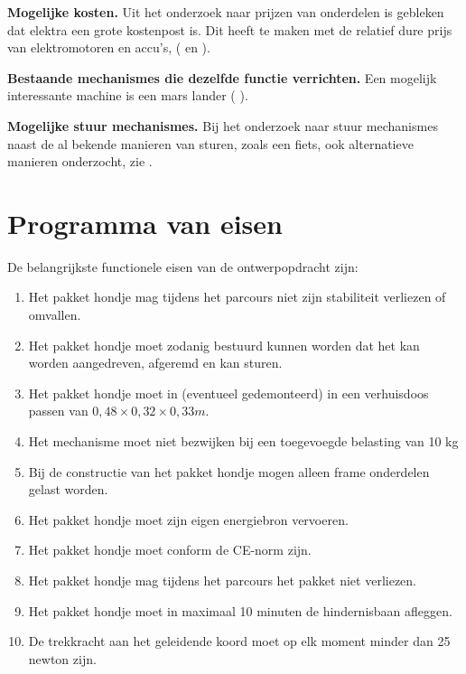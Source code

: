 \textbf{Mogelijke kosten.} Uit het onderzoek naar prijzen van onderdelen is gebleken dat elektra een grote kostenpost is. Dit heeft te maken met de relatief dure prijs van elektromotoren en accu's, (\cite{123accu.nl} en \cite{Conrad}).
\vspace{\baselineskip}

\textbf{Bestaande mechanismes die dezelfde functie verrichten.} Een mogelijk interessante machine is een mars lander ( \cite{r.g._bonitz_nguyen_kim_bonitz_folkner_golombek_olson_spohn_grott_et_al._1970}).
\vspace{\baselineskip}

\textbf{Mogelijke stuur mechanismes.} Bij het onderzoek naar stuur mechanismes naast de al bekende manieren van sturen, zoals een fiets, ook alternatieve manieren onderzocht, zie \cite{Stuurmechanisme}.
\vspace{\baselineskip}


\vspace{\baselineskip}

\section{Programma van eisen}
\label{se:PVE}

De belangrijkste functionele eisen van de ontwerpopdracht zijn: 
\begin{enumerate}
    \item Het pakket hondje mag tijdens het parcours niet zijn stabiliteit verliezen of omvallen.
    \item Het pakket hondje moet zodanig bestuurd kunnen worden dat het kan worden aangedreven, afgeremd en kan sturen.
    \item Het pakket hondje moet in (eventueel gedemonteerd) in een verhuisdoos passen van $ 0,48 \times 0,32 \times 0,33 m.$
    \item Het mechanisme moet niet bezwijken bij een toegevoegde belasting van 10 kg 
    \item Bij de constructie van het pakket hondje mogen alleen frame onderdelen gelast worden.
    \item Het pakket hondje moet zijn eigen energiebron vervoeren.
    \item Het pakket hondje moet conform de CE-norm zijn.
    \item Het pakket hondje mag tijdens het parcours het pakket niet verliezen.
    \item Het pakket hondje moet in maximaal 10 minuten de hindernisbaan afleggen.
    \item De trekkracht aan het geleidende koord moet op elk moment minder dan 25 newton zijn.
\end{enumerate} 
\vspace{\baselineskip}

